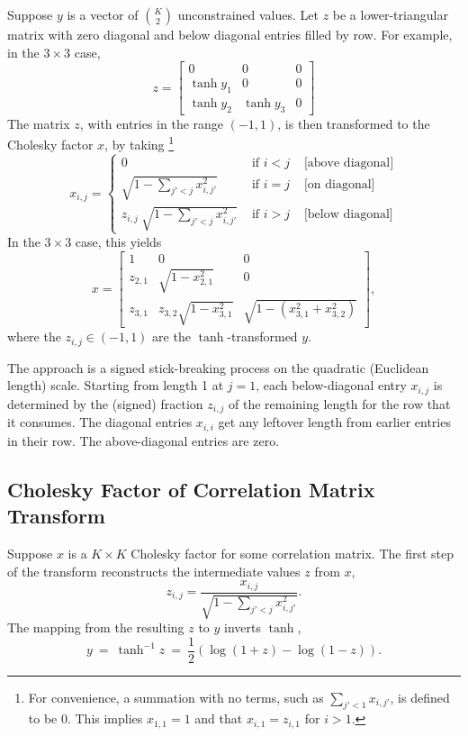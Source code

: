 Suppose $y$ is a vector of $\binom{K}{2}$ unconstrained values.  Let
$z$ be a lower-triangular matrix with zero diagonal and below
diagonal entries filled by row.  For example, in the $3 \times 3$
case,
\[
z =
\left[
\begin{array}{ccc}
0 & 0 & 0
\\
\tanh y_1 & 0 & 0
\\
\tanh y_2 & \tanh y_3 & 0
\end{array}
\right] 
\]
%
The matrix $z$, with entries in the range $(-1,1)$, is then
transformed to the Cholesky factor $x$, by taking%
%
\footnote{For convenience, a summation with no terms, such as
  $\sum_{j' < 1} x_{i,j'}$, is defined to be 0.  This implies
  $x_{1,1} = 1$ and that $x_{i,1} = z_{i,1}$ for $i > 1$.}
%
\[
x_{i,j}
=
\left\{
\begin{array}{lll}
0 & \mbox{ if } i < j & \mbox{ [above diagonal]}
\\[12pt]
\sqrt{1 - \sum_{j' < j} x_{i,j'}^2}
  & \mbox{ if } i = j & \mbox{ [on diagonal]}
\\[12pt]
z_{i,j} \ \sqrt{1 - \sum_{j' < j} x_{i,j'}^2}
  & \mbox{ if } i > j & \mbox{ [below diagonal]}
\end{array}
\right.
\]
%
In the $3 \times 3$ case, this yields
\[
x = 
\left[
\begin{array}{ccc}
1 & 0 & 0
\\[6pt]
z_{2,1} & \sqrt{1 - x_{2,1}^2} & 0
\\[6pt]
z_{3,1} & z_{3,2} \sqrt{1 - x_{3,1}^2} 
        & \sqrt{1 - (x_{3,1}^2 + x_{3,2}^2)} 
\end{array}
\right],
\]
where the $z_{i,j} \in (-1,1)$ are the $\tanh$-transformed $y$.

The approach is a signed stick-breaking process on the quadratic
(Euclidean length) scale.  Starting from length 1 at $j=1$, each
below-diagonal entry $x_{i,j}$ is determined by the (signed) fraction
$z_{i,j}$ of the remaining length for the row that it consumes. The
diagonal entries $x_{i,i}$ get any leftover length from earlier
entries in their row.  The above-diagonal entries are zero.

\subsection{Cholesky Factor of Correlation Matrix Transform}

Suppose $x$ is a $K \times K$ Cholesky factor for some correlation
matrix.  The first step of the transform reconstructs the intermediate
values $z$ from $x$, 
\[
z_{i,j} = \frac{x_{i,j}}{\sqrt{1 - \sum_{j' < j}x_{i,j'}^2}}.
\]
%
The mapping from the resulting $z$ to $y$ inverts
$\tanh$, 
\[
y 
\ = \
\tanh^{-1} z
\ = \
\frac{1}{2} \left( \log (1 + z) - \log (1 - z) \right).
\]
%


